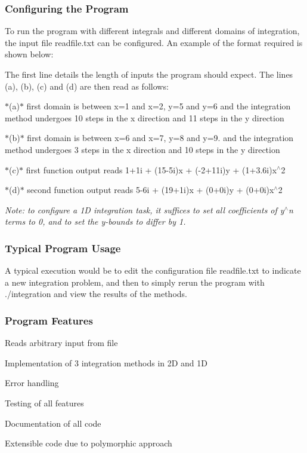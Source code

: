 \subsubsection*{Configuring the Program}

To run the program with different integrals and different domains of integration, the input file {\ttfamily readfile.\+txt} can be configured. An example of the format required is shown below\+:



The first line details the length of inputs the program should expect. The lines (a), (b), (c) and (d) are then read as follows\+:
\begin{DoxyItemize}
\item $\ast$(a)$\ast$ first domain is between x=1 and x=2, y=5 and y=6 and the integration method undergoes 10 steps in the x direction and 11 steps in the y direction
\item $\ast$(b)$\ast$ first domain is between x=6 and x=7, y=8 and y=9. and the integration method undergoes 3 steps in the x direction and 10 steps in the y direction
\item $\ast$(c)$\ast$ first function output reads 1+1i + (15-\/5i)x + (-\/2+11i)y + (1+3.6i)x$^\wedge$2
\item $\ast$(d)$\ast$ second function output reads 5-\/6i + (19+1i)x + (0+0i)y + (0+0i)x$^\wedge$2
\end{DoxyItemize}

{\itshape Note\+: to configure a 1D integration task, it suffices to set all coefficients of y$^\wedge$n terms to 0, and to set the y-\/bounds to differ by 1.}

\subsubsection*{Typical Program Usage}

A typical execution would be to edit the configuration file {\ttfamily readfile.\+txt} to indicate a new integration problem, and then to simply rerun the program with {\ttfamily ./integration} and view the results of the methods.

\subsubsection*{Program Features}


\begin{DoxyItemize}
\item Reads arbitrary input from file
\item Implementation of 3 integration methods in 2D and 1D
\item Error handling
\item Testing of all features
\item Documentation of all code
\item Extensible code due to polymorphic approach
\end{DoxyItemize}

